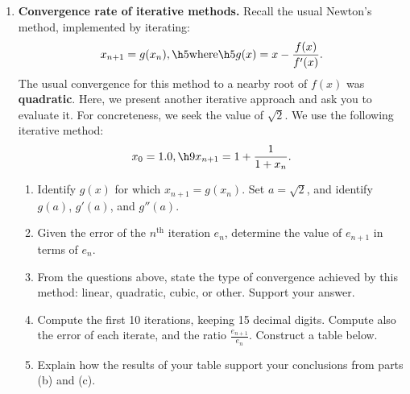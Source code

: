 \documentclass[12pt,twoside,openany]{memoir}
\begin{document}
\newpage
\phantom{a}
\newpage
\vspace{25pt}
\begin{enumerate}[label = \arabic*.]
    \addtocounter{enumi}{2}
    \item \textbf{Convergence rate of iterative methods.} Recall the usual Newton's method, implemented by iterating:
        \begin{equation*}
        \begin{split}
            x_{n+1} = g(x_n), \h5 \text{where} \h5 g(x) = x - \frac{f(x)}{f'(x)}.
        \end{split}
        \end{equation*}
    The usual convergence for this method to a nearby root of $f(x)$ was \textbf{quadratic}. Here, we present another iterative approach and ask you to evaluate it. For concreteness, we seek the value of $\sqrt{2}$. We use the following iterative method:
        \begin{equation*}
        \begin{split}
            x_0 = 1.0, \h9 x_{n+1} = 1 + \frac{1}{1 + x_n}.
        \end{split}
        \end{equation*}

    \begin{enumerate}[label = (\alph*)]
        \item Identify $g(x)$ for which $x_{n+1} = g(x_n)$. Set $a = \sqrt{2}$, and identify $g(a)$, $g'(a)$, and $g''(a)$.
        \item Given the error of the $n^\text{th}$ iteration $e_n$, determine the value of $e_{n+1}$ in terms of $e_n$.
        \item From the questions above, state the type of convergence achieved by this method: linear, quadratic, cubic, or other. Support your answer.
        \item Compute the first 10 iterations, keeping 15 decimal digits. Compute also the error of each iterate, and the ratio $\frac{e_{n+1}}{e_n}$. Construct a table below.
        \item Explain how the results of your table support your conclusions from parts (b) and (c).
    \end{enumerate}
\end{enumerate}
    
\end{document}
